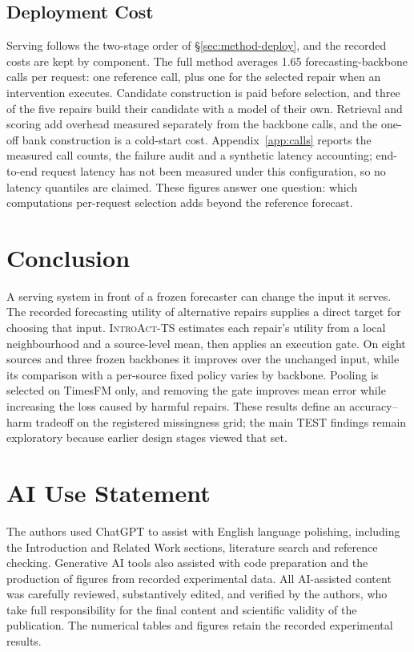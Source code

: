 \documentclass{article}
\newcommand{\introact}{\textsc{IntroAct-TS}}
\begin{document}
\subsection{Deployment Cost}
\label{sec:exp-cost}
Serving follows the two-stage order of \S\ref{sec:method-deploy}, and the recorded costs are
kept by component. The full method averages 1.65 forecasting-backbone calls per request: one
reference call, plus one for the selected repair when an intervention executes. Candidate
construction is paid before selection, and three of the five repairs build their candidate
with a model of their own. Retrieval and scoring add overhead measured separately from the
backbone calls, and the one-off bank construction is a cold-start cost.
Appendix~\ref{app:calls} reports the measured call counts, the failure audit and a synthetic
latency accounting; end-to-end request latency has not been measured under this
configuration, so no latency quantiles are claimed. These figures answer one question: which
computations per-request selection adds beyond the reference forecast.

\newpage
\section{Conclusion}
\label{sec:conclusion}
A serving system in front of a frozen forecaster can change the input it serves. The recorded
forecasting utility of alternative repairs supplies a direct target for choosing that input.
\introact{} estimates each repair's utility from a local neighbourhood and a source-level
mean, then applies an execution gate. On eight sources and three frozen backbones it improves
over the unchanged input, while its comparison with a per-source fixed policy varies by
backbone. Pooling is selected on TimesFM only, and removing the gate improves mean error while
increasing the loss caused by harmful repairs. These results define an accuracy--harm tradeoff
on the registered missingness grid; the main TEST findings remain exploratory because earlier
design stages viewed that set.
\label{sec:main-end}

\section*{AI Use Statement}
\label{sec:ai-statement}
The authors used ChatGPT to assist with English language polishing, including the
Introduction and Related Work sections, literature search and reference checking.
Generative AI tools also assisted with code preparation and the production of figures
from recorded experimental data. All AI-assisted content was carefully reviewed,
substantively edited, and verified by the authors, who take full responsibility for
the final content and scientific validity of the publication. The numerical tables
and figures retain the recorded experimental results.
\end{document}
